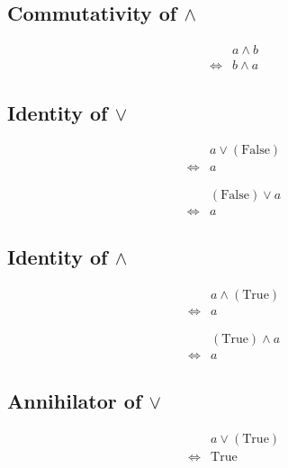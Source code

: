 \subsection{Commutativity of $\land$}
\begin{prop}
\label{Proposition:land_commutativity}
\begin{align*}
& a \land b \\
\iff & b \land a
\end{align*}
\end{prop}

\subsection{Identity of $\lor$}
\begin{prop}
\label{Proposition:lor_identity_1}
\begin{align*}
& a \lor (\text{False}) \\
\iff & a
\end{align*}
\end{prop}

\begin{prop}
\label{Proposition:lor_identity_2}
\begin{align*}
& (\text{False}) \lor a \\
\iff & a
\end{align*}
\end{prop}

\subsection{Identity of $\land$}
\begin{prop}
\label{Proposition:land_identity_1}
\begin{align*}
& a \land (\text{True}) \\
\iff & a
\end{align*}
\end{prop}

\begin{prop}
\label{Proposition:land_identity_2}
\begin{align*}
& (\text{True}) \land a \\
\iff & a
\end{align*}
\end{prop}

\subsection{Annihilator of $\lor$}
\begin{prop}
\label{Proposition:lor_annihilator_1}
\begin{align*}
& a \lor (\text{True}) \\
\iff & \text{True}
\end{align*}
\end{prop}

